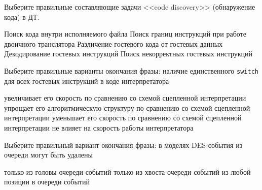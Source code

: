 \documentclass[a4paper, addpoints, answers]{exam}
\begin{document}
\begin{questions}
    
    
\question[1] Выберите правильные составляющие задачи <<code discovery>> (обнаружение кода) в ДТ.
\begin{choices}
     \choice Поиск кода внутри исполняемого файла
     \correctchoice Поиск границ инструкций при работе двоичного транслятора
     \correctchoice Различение гостевого кода от гостевых данных
     \choice     Декодирование гостевых инструкций
     \choice Поиск некорректных гостевых инструкций
\end{choices}

    
\question[1] Выберите правильные варианты окончания фразы: наличие единственного \texttt{switch} для всех гостевых инструкций в коде интерпретатора
\begin{choices}
    \choice увеличивает его скорость по сравнению со схемой сцепленной интерпретации
    \choice упрощает его алгоритмическую структуру по сравнению со схемой сцепленной интерпретации
    \correctchoice уменьшает его скорость по сравнению со схемой сцепленной интерпретации
    \choice не влияет на скорость работы интерпретатора
\end{choices}


\question[1] Выберите правильный вариант окончания фразы: в моделях DES события из очереди могут быть удалены
\begin{choices}
    \choice только из головы очереди событий
    \choice только из хвоста очереди событий
    \correctchoice из любой позиции в очереди событий
\end{choices}



\end{questions}
\end{document}
